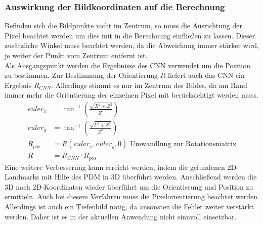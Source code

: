 \subsubsection{Auswirkung der Bildkoordinaten auf die Berechnung}
Befinden sich die Bildpunkte nicht im Zentrum, so muss die Ausrichtung der Pixel beachtet werden um dies mit in die Berechnung einfließen zu lassen. Dieser zusätzliche Winkel muss beachtet werden, da die Abweichung immer stärker wird, je weiter der Punkt vom Zentrum entfernt ist.\\ 
Als Ausgangspunkt werden die Ergebnisse des CNN verwendet um die Position zu bestimmen. Zur Bestimmung der Orientierung $R$ liefert auch das CNN ein Ergebnis $R_{CNN}$. Allerdings stimmt es nur im Zentrum des Bildes, da am Rand immer mehr die Orientierung der einzelnen Pixel mit berücksichtigt werden muss.\\
\begin{align*}
euler_x &= \tan^{-1}(\frac{\sqrt{X^2+Z^2}}{Z^2})\\
euler_y &= \tan^{-1}(\frac{\sqrt{Y^2+Z^2}}{Z^2})\\
R_{pos} &= R(euler_x,euler_y,0)\text{ Umwandlung zur Rotationsmatrix}\\
R &= R_{CNN}\cdot R_{pos}
\end{align*}
Eine weitere Verbesserung kann erreicht werden, indem die gefundenen 2D-Landmarks mit Hilfe des PDM in 3D überführt werden. Anschließend werden die 3D nach 2D-Koordinaten wieder überführt um die Orientierung und Position zu ermitteln. Auch bei diesem Verfahren muss die Pixelorientierung beachtet werden. Allerdings ist auch ein Tiefenbild nötig, da ansonsten die Fehler weiter verstärkt werden. Daher ist es in der aktuellen Anwendung nicht sinnvoll einsetzbar.\cite{OpenFace}
